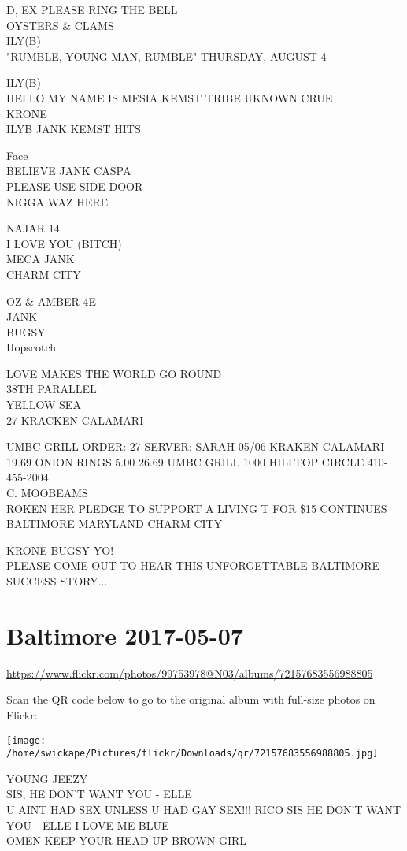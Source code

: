 \documentclass[10pt,letterpaper]{article}
\begin{document}
D, EX PLEASE RING THE BELL\\
OYSTERS \& CLAMS\\
ILY(B)\\
"RUMBLE, YOUNG MAN, RUMBLE" THURSDAY, AUGUST 4

ILY(B)\\
HELLO MY NAME IS MESIA KEMST TRIBE UKNOWN CRUE\\
KRONE\\
ILYB JANK KEMST HITS

Face\\
BELIEVE JANK CASPA\\
PLEASE USE SIDE DOOR\\
NIGGA WAZ HERE

NAJAR 14\\
I LOVE YOU (BITCH)\\
MECA JANK\\
CHARM CITY

OZ \& AMBER 4E\\
JANK\\
BUGSY\\
Hopscotch

LOVE MAKES THE WORLD GO ROUND\\
38TH PARALLEL\\
YELLOW SEA\\
27 KRACKEN CALAMARI

UMBC GRILL ORDER: 27 SERVER: SARAH 05/06 KRAKEN CALAMARI 19.69 ONION RINGS 5.00 26.69 UMBC GRILL 1000 HILLTOP CIRCLE 410{-}455{-}2004\\
C. MOOBEAMS\\
ROKEN HER PLEDGE TO SUPPORT A LIVING T FOR \$15 CONTINUES\\
BALTIMORE MARYLAND CHARM CITY

KRONE BUGSY YO!\\
PLEASE COME OUT TO HEAR THIS UNFORGETTABLE BALTIMORE SUCCESS STORY...


\section*{Baltimore 2017-05-07}

\url{https://www.flickr.com/photos/99753978@N03/albums/72157683556988805}

Scan the QR code below to go to the original album with full-size photos on Flickr:

\texttt{[image: /home/swickape/Pictures/flickr/Downloads/qr/72157683556988805.jpg]}


YOUNG JEEZY\\
SIS, HE DON'T WANT YOU {-} ELLE\\
U AINT HAD SEX UNLESS U HAD GAY SEX!!! RICO SIS HE DON'T WANT YOU {-} ELLE I LOVE ME BLUE\\
OMEN KEEP YOUR HEAD UP BROWN GIRL
\end{document}
